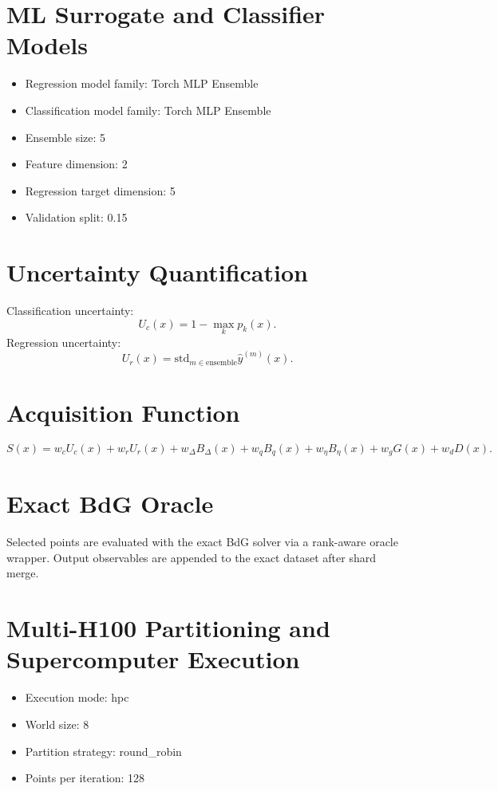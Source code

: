 \documentclass[11pt]{article}
\begin{document}
\section{ML Surrogate and Classifier Models}
\begin{itemize}
\item Regression model family: Torch MLP Ensemble
\item Classification model family: Torch MLP Ensemble
\item Ensemble size: 5
\item Feature dimension: 2
\item Regression target dimension: 5
\item Validation split: 0.15
\end{itemize}

\section{Uncertainty Quantification}
Classification uncertainty:
\[
U_c(x) = 1 - \max_k p_k(x).
\]
Regression uncertainty:
\[
U_r(x) = \mathrm{std}_{m \in \text{ensemble}} \hat{y}^{(m)}(x).
\]

\section{Acquisition Function}
\[
S(x) =
w_c U_c(x)
+ w_r U_r(x)
+ w_\Delta B_\Delta(x)
+ w_q B_q(x)
+ w_\eta B_\eta(x)
+ w_g G(x)
+ w_d D(x).
\]

\section{Exact BdG Oracle}
Selected points are evaluated with the exact BdG solver via a rank-aware oracle wrapper. Output observables are appended to the exact dataset after shard merge.

\section{Multi-H100 Partitioning and Supercomputer Execution}
\begin{itemize}
\item Execution mode: hpc
\item World size: 8
\item Partition strategy: round\_robin
\item Points per iteration: 128
\end{itemize}
\end{document}
